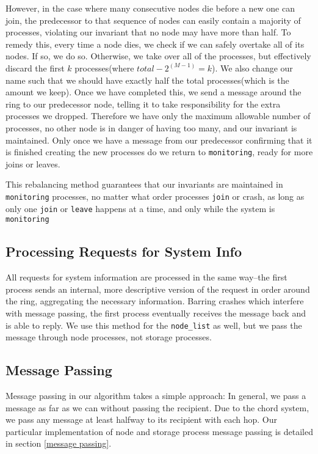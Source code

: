 \documentclass[a4paper]{article}
\begin{document}
However, in the case where many consecutive nodes die before a new one can join, the predecessor to that sequence of nodes can easily contain a majority of processes, violating our invariant that no node may have more than half. To remedy this, every time a node dies, we check if we can safely overtake all of its nodes. If so, we do so. Otherwise, we take over all of the processes, but effectively discard the first $k$ processes(where $total - 2^(M-1) = k$). We also change our name such that we should have exactly half the total processes(which is the amount we keep). Once we have completed this, we send a message around the ring to our predecessor node, telling it to take responsibility for the extra processes we dropped. Therefore we have only the maximum allowable number of processes, no other node is in danger of having too many, and our invariant is maintained. Only once we have a message from our predecessor confirming that it is finished creating the new processes do we return to {\tt monitoring}, ready for more joins or leaves. 

This rebalancing method guarantees that our invariants are maintained in {\tt monitoring} processes, no matter what order processes {\tt join} or crash, as long as only one {\tt join} or {\tt leave} happens at a time, and only while the system is {\tt monitoring}

\subsection{Processing Requests for System Info}

All requests for system information are processed in the same way--the first process sends an internal, more descriptive version of the request in order around the ring, aggregating the necessary information. Barring crashes which interfere with message passing, the first process eventually receives the message back and is able to reply. We use this method for the {\tt node\_list} as well, but we pass the message through node processes, not storage processes.

\subsection{Message Passing}

Message passing in our algorithm takes a simple approach: In general, we pass a message as far as we can without passing the recipient. Due to the chord system, we pass any message at least halfway to its recipient with each hop. Our particular implementation of node and storage process message passing is detailed in section \ref{message passing}.\\


\end{document}
